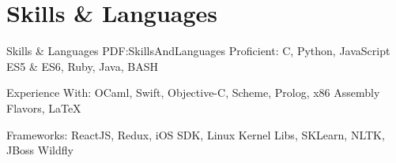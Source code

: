 \section
{Skills \&\newline
Languages}
{Skills \& Languages}
{PDF:SkillsAndLanguages}
\BulletItem
Proficient: C, Python, JavaScript ES5 \& ES6, Ruby, Java, BASH

\GapNoBreak
\BulletItem
Experience With: OCaml, Swift, Objective-C, Scheme, Prolog, x86 Assembly Flavors, {\LaTeX}

\GapNoBreak
\BulletItem
Frameworks: ReactJS, Redux, iOS SDK, Linux Kernel Libs, SKLearn, NLTK, JBoss Wildfly